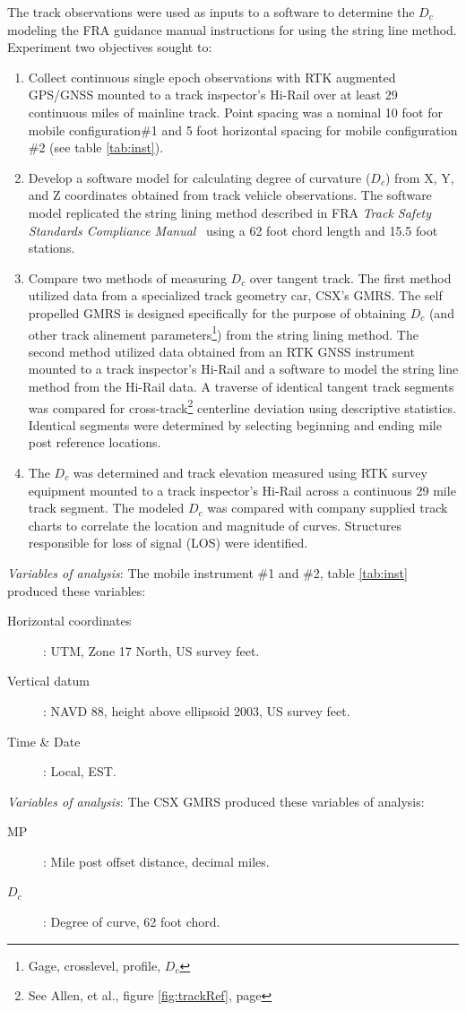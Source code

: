 The track observations were used as inputs to a software to determine the ${D_c}$ modeling the FRA guidance manual instructions for using the string line method.
Experiment two objectives sought to:
\begin{enumerate}
	\item Collect continuous single epoch observations with RTK augmented GPS/GNSS mounted to a track inspector's Hi-Rail over at least 29 continuous miles of mainline track. Point spacing was a nominal 10 foot for mobile configuration\#1 and 5 foot horizontal spacing for mobile configuration \#2 (see table \ref{tab:inst}).
	\item Develop a software model for calculating degree of curvature (${D_c}$) from X, Y, and Z coordinates obtained from track vehicle observations. The software model replicated the string lining method described in FRA \emph{Track Safety Standards Compliance Manual}~\citep[pp.26-30]{2007FRATrack} using a 62 foot chord length and 15.5 foot stations.
	\item Compare two methods of measuring ${D_c}$ over tangent track. The first method utilized data from a specialized track geometry car, CSX's GMRS. The self propelled GMRS is designed specifically for the purpose of obtaining ${D_c}$ (and other track alinement parameters\footnote{Gage, crosslevel, profile, ${D_c}$}) from the string lining method. The second method utilized data obtained from an RTK GNSS instrument mounted to a track inspector's Hi-Rail and a software to model the string line method from the Hi-Rail data.
	A traverse of identical tangent track segments was compared for cross-track\footnote{See Allen, et al., figure \ref{fig:trackRef}, page \pageref{fig:trackRef}} centerline deviation using descriptive statistics. Identical segments were determined by selecting beginning and ending mile post reference locations.
	\item The ${D_c}$ was determined and track elevation measured using RTK survey equipment mounted to a track inspector's Hi-Rail across a continuous 29 mile track segment. The modeled ${D_c}$ was compared with company supplied track charts to correlate the location and magnitude of curves. Structures responsible for loss of signal (LOS) were identified.
\end{enumerate}

\emph{Variables of analysis}: The mobile instrument \#1 and \#2, table \ref{tab:inst} produced these variables:
\begin{description}
	\item [Horizontal coordinates]: UTM, Zone 17 North, US survey feet.
	\item [Vertical datum]: NAVD 88, height above ellipsoid 2003, US survey feet.
	\item [Time \& Date]: Local, EST.
\end{description}
\emph{Variables of analysis}: The CSX GMRS produced these variables of analysis:
\begin{description}
	\item [MP]: Mile post offset distance, decimal miles.
	\item [${D_c}$]: Degree of curve, 62 foot chord.
\end{description}

